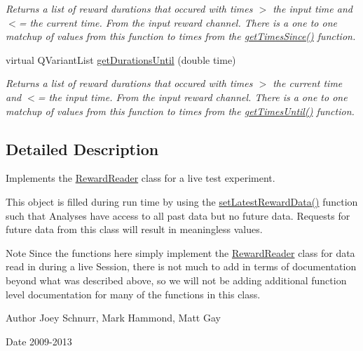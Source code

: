 \begin{DoxyCompactItemize}
\begin{DoxyCompactList}\small\item\em Returns a list of reward durations that occured with times $>$ the input time and $<$= the current time. From the input reward channel. There is a one to one matchup of values from this function to times from the \hyperlink{class_picto_1_1_live_reward_reader_a8d510c6e0411de019dc58edbd127ba7b}{get\-Times\-Since()} function. \end{DoxyCompactList}\item 
\hypertarget{class_picto_1_1_live_reward_reader_a5847f68ff39a0ca11ef70c3856840d32}{virtual Q\-Variant\-List \hyperlink{class_picto_1_1_live_reward_reader_a5847f68ff39a0ca11ef70c3856840d32}{get\-Durations\-Until} (double time)}\label{class_picto_1_1_live_reward_reader_a5847f68ff39a0ca11ef70c3856840d32}

\begin{DoxyCompactList}\small\item\em Returns a list of reward durations that occured with times $>$ the current time and $<$= the input time. From the input reward channel. There is a one to one matchup of values from this function to times from the \hyperlink{class_picto_1_1_live_reward_reader_aaa642f941e1bc609dca54c8c98208700}{get\-Times\-Until()} function. \end{DoxyCompactList}\end{DoxyCompactItemize}


\subsection{Detailed Description}
Implements the \hyperlink{class_picto_1_1_reward_reader}{Reward\-Reader} class for a live test experiment. 

This object is filled during run time by using the \hyperlink{class_picto_1_1_live_reward_reader_ac1061add1e058abbb6e67d1348e19381}{set\-Latest\-Reward\-Data()} function such that Analyses have access to all past data but no future data. Requests for future data from this class will result in meaningless values. \begin{DoxyNote}{Note}
Since the functions here simply implement the \hyperlink{class_picto_1_1_reward_reader}{Reward\-Reader} class for data read in during a live Session, there is not much to add in terms of documentation beyond what was described above, so we will not be adding additional function level documentation for many of the functions in this class. 
\end{DoxyNote}
\begin{DoxyAuthor}{Author}
Joey Schnurr, Mark Hammond, Matt Gay 
\end{DoxyAuthor}
\begin{DoxyDate}{Date}
2009-\/2013 
\end{DoxyDate}


